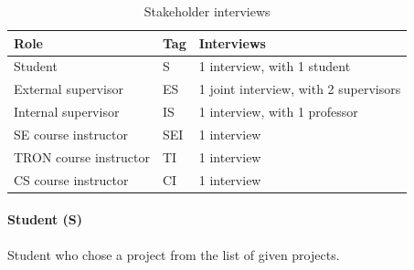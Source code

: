 \documentclass[12pt]{article}
\begin{document}
  \begin{table}[h!]
    \centering
    \begin{tabular}{lll}
      \toprule
      \textbf{Role} & \textbf{Tag} & \textbf{Interviews}\\
      \midrule
      Student & S & 1 interview, with 1 student\\
      External supervisor & ES & 1 joint interview, with 2 supervisors\\
      Internal supervisor & IS & 1 interview, with 1 professor\\
      SE course instructor & SEI & 1 interview\\
      TRON course instructor & TI & 1 interview\\
      CS course instructor & CI & 1 interview\\
      \bottomrule
    \end{tabular}
    \caption{Stakeholder interviews}\label{tab:interviews}
  \end{table}

\paragraph{Student (S)} \label{app:stk_student}
Student who chose a project from the list of given projects.
\end{document}
